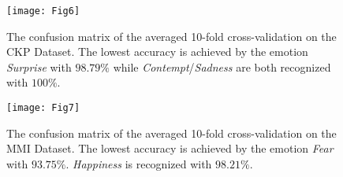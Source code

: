 \documentclass[10pt,journal,compsoc, hidelinks]{IEEEtran}
\newcommand{\paraV}{\vspace{1em}}
\begin{document}
\begin{table}[b]
\centering
\caption{The CKP database has been very well analyzed and the best possible recognition accuracy has been achieved by Aliya Zafar. It is noteworthy that the samples he used for training are not randomly selected and no cross-validation has been applied. Evaluating this database provides information whether the proposed approach can compete with those results.}
\label{tab:ckp_results}

\end{table}


\begin{figure*}[ht!]
\centering
\begin{subfigure}[b]{0.46\textwidth}
\centering
\texttt{[image: Fig6]}
\caption{The confusion matrix of the averaged 10-fold cross-validation on the CKP Dataset. The lowest accuracy is achieved by the emotion \textit{Surprise} with $98.79\%$ while \textit{Contempt}/\textit{Sadness} are both recognized with $100\%$.}
\label{fig:ckp_conf}
\end{subfigure}
\hspace{0.05\textwidth}
\begin{subfigure}[b]{0.46\textwidth}
\centering
\texttt{[image: Fig7]}
\caption{The confusion matrix of the averaged 10-fold cross-validation on the MMI Dataset. The lowest accuracy is achieved by the emotion \textit{Fear} with $93.75\%$. \textit{Happiness} is recognized with $98.21\%$.\\~}
\label{fig:mmi_conf}
\end{subfigure}
\end{figure*}


\paraV
\end{document}
